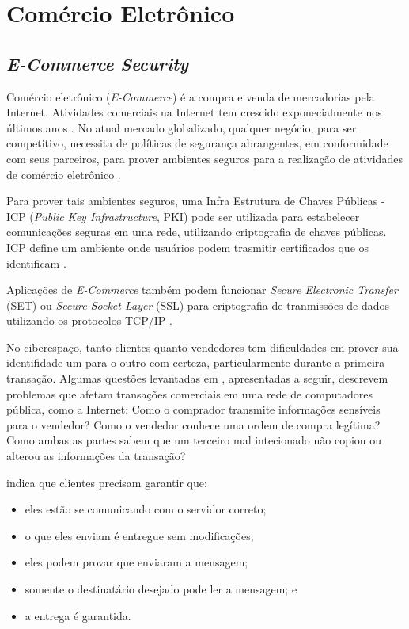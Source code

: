 \section{Comércio Eletrônico}


\subsection{\textit{E-Commerce Security}} \label{e-commerce-secutiry}

Comércio eletrônico (\textit{E-Commerce}) é a compra e venda de mercadorias pela Internet. Atividades comerciais na Internet tem crescido exponecialmente nos últimos anos \cite{al2008commerce}. No atual mercado globalizado, qualquer negócio, para ser competitivo, necessita de políticas de segurança abrangentes, em conformidade com seus parceiros, para prover ambientes seguros para a realização de atividades de comércio eletrônico \cite{al2008commerce}.

Para prover tais ambientes seguros, uma Infra Estrutura de Chaves Públicas - ICP (\textit{Public Key Infrastructure}, PKI) pode ser utilizada para estabelecer comunicações seguras em uma rede, utilizando criptografia de chaves públicas. ICP define um ambiente onde usuários podem trasmitir certificados que os identificam \cite{al2008commerce}. 

Aplicações de \textit{E-Commerce} também podem funcionar \textit{Secure Electronic Transfer} (SET) ou \textit{Secure Socket Layer} (SSL) para criptografia de tranmissões de dados utilizando os protocolos TCP/IP \cite{al2008commerce}.

No ciberespaço, tanto clientes quanto vendedores tem dificuldades em prover sua identifidade um para o outro com certeza, particularmente durante a primeira transação. Algumas questões levantadas em \cite{al2008commerce}, apresentadas a seguir, descrevem problemas que afetam transações comerciais em uma rede de computadores pública, como a Internet: Como o comprador transmite informações sensíveis para o vendedor? Como o vendedor conhece uma ordem de compra legítima? Como ambas as partes sabem que um terceiro mal intecionado não copiou ou alterou as informações da transação? 

\cite{al2008commerce} indica que clientes precisam garantir que:
\begin{itemize}
	\item eles estão se comunicando com o servidor correto;
  \item o que eles enviam é entregue sem modificações;
  \item eles podem provar que enviaram a mensagem;
  \item somente o destinatário desejado pode ler a mensagem; e
  \item a entrega é garantida.
\end{itemize}

